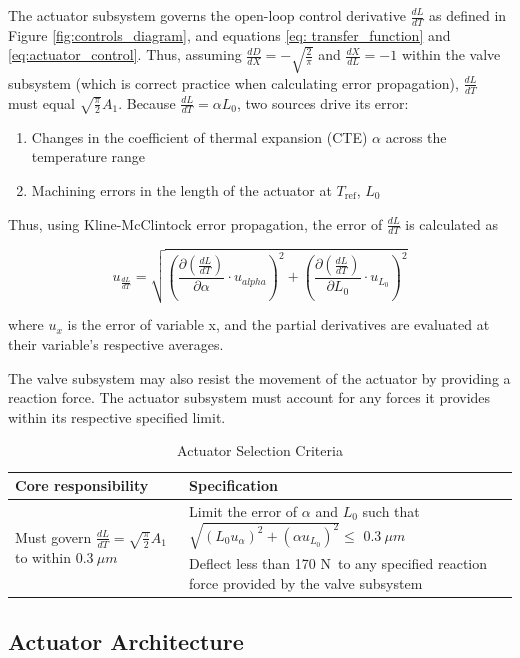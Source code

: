 \documentclass[12pt, letterpaper]{report}%
\newcounter{mycounter}           %
\newcounter{sub}[mycounter]      %
\newcommand{\FTolValve}{170 N}
\newcommand{\dLdTTolAct}{$0.3\ \mu m$}
\newcommand{\FTolAct}{\FTolValve}
\newcommand{\actSpecs}
{%
    \renewcommand{\arraystretch}{1.4}
    \begin{tabular}{|m{0.45\textwidth}|m{0.5\textwidth}|}
    \hline
    \textbf{Core responsibility} & \textbf{Specification} \\ \hline

    \multirow[c]{2}{0.45\textwidth}{%
        Must govern $\frac{dL}{dT} = \sqrt{\frac{\pi}{2}} A_1$ to within \dLdTTolAct%
    }
    &
    Limit the error of $\alpha$ and $L_0$ such that 
        $\sqrt{ \left( L_0 u_{\alpha} \right) ^2 + \left( \alpha u_{L_0} \right) ^2} \leq$ \dLdTTolAct
    \\ \cline{2-2}
    &
    Deflect less than \FTolAct\ to any specified reaction force provided by the valve subsystem
    \\ \hline

    \end{tabular}

}
\begin{document}
        The actuator subsystem governs the open-loop control derivative $\frac{dL}{dT}$
        as defined in Figure \ref{fig:controls_diagram}, and equations \ref{eq: transfer_function} and \ref{eq:actuator_control}.
        Thus, assuming $\frac{dD}{dX} = -\sqrt{\frac{2}{\pi}}$ and $\frac{dX}{dL} = -1$ within the valve subsystem
        (which is correct practice when calculating error propagation),
        $\frac{dL}{dT}$ must equal $\sqrt{\frac{\pi}{2}} A_1$.
        Because
        $\frac{dL}{dT} = \alpha L_0$,
        two sources drive its error:

        \begin{enumerate}
            \item Changes in the coefficient of thermal expansion (CTE) $\alpha$ across the temperature range
            \item Machining errors in the length of the actuator at $T_{\text{ref}}$, $L_0$
        \end{enumerate}

        Thus, using Kline-McClintock error propagation, the error of $\frac{dL}{dT}$ is calculated as
        
        \begin{equation}
            u_{\frac{dL}{dT}} =
            \sqrt{
                \left( \frac{\partial \left( \frac{dL}{dT} \right)}{\partial \alpha} \cdot u_{alpha} \right)^2 + 
                \left( \frac{\partial \left( \frac{dL}{dT} \right)}{\partial L_0} \cdot u_{L_0} \right)^2}
            \label{eq:udLdX}
        \end{equation}

        where $u_x$ is the error of variable x, and the partial derivatives are evaluated at their variable's respective averages. \cite{ref_Figliola}

        The valve subsystem may also resist the movement of the actuator by providing a reaction force.
        The actuator subsystem must account for any forces it provides within its respective specified limit.

            \begin{table}[H]
                \centering
                \caption{Actuator Selection Criteria}
                \actSpecs
                \label{tab:act_specs}
            \end{table}

        \subsection{Actuator Architecture}
\end{document}
